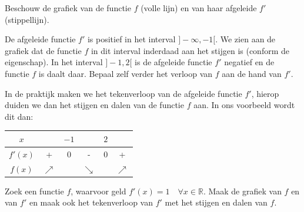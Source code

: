 \documentclass[a4paper,12pt,twoside]{article}
\begin{document}
Beschouw de grafiek van de functie $f$ (volle lijn) en van haar afgeleide $f'$ (stippellijn).
\begin{center}
\end{center}
De afgeleide functie $f'$ is positief in het interval $]-\infty, -1[$. We zien aan de grafiek dat de functie $f$ in dit interval inderdaad aan het stijgen is (conform de eigenschap). In het interval $]-1, 2[$ is de afgeleide functie $f'$ negatief en de functie $f$ is daalt daar. Bepaal zelf verder het verloop van $f$ aan de hand van $f'$.

In de praktijk maken we het tekenverloop van de afgeleide functie $f'$, hierop duiden we dan het stijgen en dalen van de functie $f$ aan. In ons voorbeeld wordt dit dan:
\begin{center}
  \begin{tabular}{c|ccccc}
    $x$ & \hspace*{1.0cm} & $-1$ & \hspace*{1.0cm} & $2$ & \hspace*{1.0cm}\\
    \hline
    $f'(x)$ & + & 0 & - & 0 & +\\
    \hline
    $f(x)$ & $\nearrow$ & & $\searrow$ & & $\nearrow$
  \end{tabular}
\end{center}



\begin{oefening}
  Zoek een functie $f$, waarvoor geld $f'(x)=1\quad \forall x\in\mathbb{R}$. Maak de grafiek van $f$ en van $f'$ en maak ook het tekenverloop van $f'$ met het stijgen en dalen van $f$.
\end{oefening}
\end{document}
